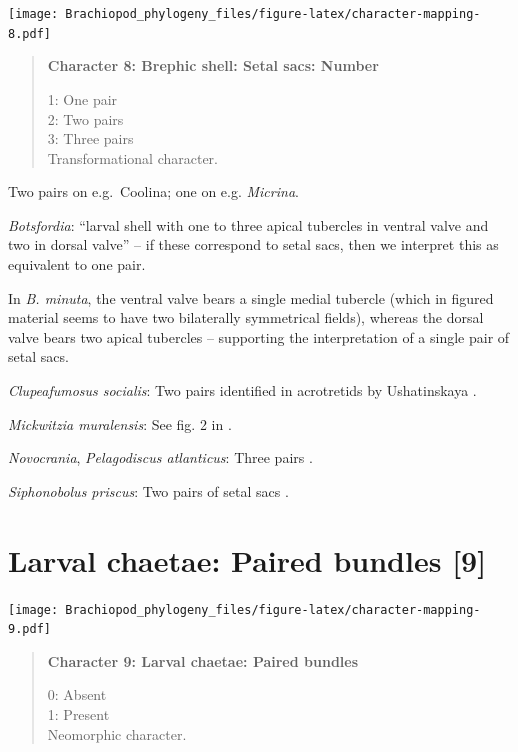 \documentclass[openany]{book}
\begin{document}
\texttt{[image: Brachiopod\_phylogeny\_files/figure-latex/character-mapping-8.pdf]}

\begin{quote}
\textbf{Character 8: Brephic shell: Setal sacs: Number}

1: One pair\\
2: Two pairs\\
3: Three pairs\\
Transformational character.
\end{quote}

Two pairs on e.g.~Coolina; one on e.g. \emph{Micrina}.

\hypertarget{Botsfordia-coding-8}{}
\emph{Botsfordia}: ``larval shell with one to three apical tubercles in
ventral valve and two in dorsal valve''
\citep{Williams2000LinguliformeaCraniiformea} -- if these correspond to
setal sacs, then we interpret this as equivalent to one pair.

In \emph{B. minuta}, the ventral valve bears a single medial tubercle
(which in figured material seems to have two bilaterally symmetrical
fields), whereas the dorsal valve bears two apical tubercles
\citep{Li2004} -- supporting the interpretation of a single pair of
setal sacs.

\hypertarget{Clupeafumosus_socialis-coding-8}{}
\emph{Clupeafumosus socialis}: Two pairs identified in acrotretids by
Ushatinskaya \citeyearpar{Ushatinskaya2016Protegulumand}.

\hypertarget{Mickwitzia_muralensis-coding-8}{}
\emph{Mickwitzia muralensis}: See fig. 2 in
\citet{Balthasar2009Thebrachiopod}.

\hypertarget{Novocrania-coding-8}{}
\emph{Novocrania}, \emph{Pelagodiscus atlanticus}: Three pairs
\citep{Carlson1995Phylogeneticrelationships}.

\hypertarget{Siphonobolus_priscus-coding-8}{}
\emph{Siphonobolus priscus}: Two pairs of setal sacs
\citep{Popov2009Earlyontogeny}.

\section{Larval chaetae: Paired bundles
{[}9{]}}\label{larval-chaetae-paired-bundles-9}

\texttt{[image: Brachiopod\_phylogeny\_files/figure-latex/character-mapping-9.pdf]}

\begin{quote}
\textbf{Character 9: Larval chaetae: Paired bundles}

0: Absent\\
1: Present\\
Neomorphic character.
\end{quote}
\end{document}
